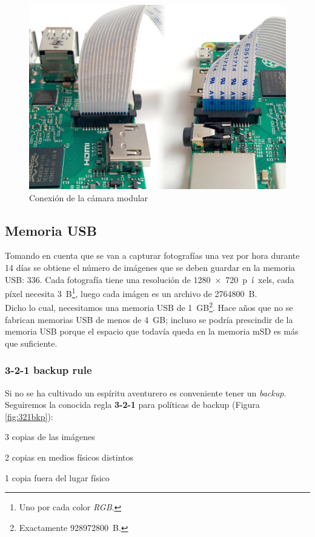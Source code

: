 \documentclass[10pt,a4paper]{article}
\begin{document}
\begin{figure}
\centering
    \includegraphics[scale=0.15]{connect-camera.jpg}
    \caption{Conexi\'on de la c\'amara modular}
    \label{fig:ribbon}
\end{figure}

\subsection{Memoria USB}

Tomando en cuenta que se van a capturar fotograf\'ias una vez por hora durante 14 d\'ias se obtiene el n\'umero de im\'agenes que se deben guardar en la memoria USB: $336$. Cada fotograf\'ia tiene una resoluci\'on de \SI{1280x720}{p\'ixels}, cada p\'ixel necesita \SI{3}{B}\footnote{Uno por cada color \emph{RGB}.}, luego cada im\'agen es un archivo de \SI{2764800}{B}.\\

Dicho lo cual, necesitamos una memoria USB de \SI{1}{GB}\footnote{Exactamente \SI{928972800}{B}.}. Hace a\~nos que no se fabrican memorias USB de menos de \SI{4}{GB}; incluso se podr\'ia prescindir de la memoria USB porque el espacio que todav\'ia queda en la memoria mSD es m\'as que suficiente.\\

\subsubsection{3-2-1 backup rule}

Si no se ha cultivado un esp\'iritu aventurero es conveniente tener un \emph{backup}. Seguiremos la conocida regla \textbf{3-2-1} para pol\'iticas de backup (Figura \ref{fig:321bkp}):
\begin{center}
    \begin{description}
        \item 3 copias de las im\'agenes
        \item 2 copias en medios f\'isicos distintos
        \item 1 copia fuera del lugar f\'isico
    \end{description}
\end{center}
\end{document}
